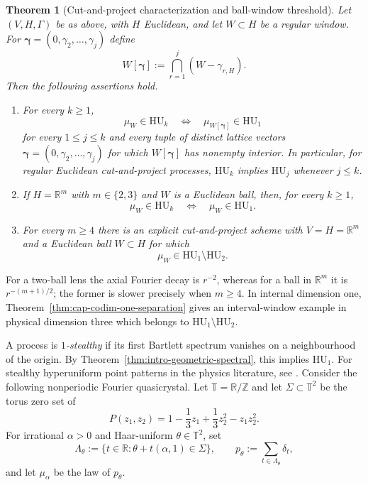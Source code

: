 \documentclass[11pt,reqno,a4paper]{amsart}
\numberwithin{equation}{section}
\theoremstyle{compact}
\newtheorem{maintheorem}{Theorem}
\theoremstyle{definition}
\theoremstyle{definition}
\newcommand{\HU}{\mathrm{HU}}
\begin{document}
\begin{maintheorem}[Cut-and-project characterization and ball-window threshold]
\label{thm:intro-cut-project}
Let $(V,H,\Gamma)$ be as above, with $H$ Euclidean, and let $W\subset H$ be
a regular window.  For
$\boldsymbol\gamma=(0,\gamma_2,\ldots,\gamma_j)$ define
\[
  W[\boldsymbol\gamma]
  :=\bigcap_{r=1}^j(W-\gamma_{r,H}).
\]
Then the following assertions hold.
\begin{enumerate}[label=\textup{(\roman*)}]
\item For every $k\geq1$,
\begin{equation}\label{eq:intro-cap-characterization}
  \mu_W\in\HU_k
  \quad\Longleftrightarrow\quad
  \mu_{W[\boldsymbol\gamma]}\in\HU_1
\end{equation}
for every $1\leq j\leq k$ and every tuple of distinct lattice vectors
$\boldsymbol\gamma=(0,\gamma_2,\ldots,\gamma_j)$ for which
$W[\boldsymbol\gamma]$ has nonempty interior.  In particular, for regular
Euclidean cut-and-project processes, $\HU_k$ implies $\HU_j$ whenever
$j\leq k$.
\item If $H=\mathbb R^m$ with $m\in\{2,3\}$ and $W$ is a Euclidean ball,
then, for every $k\geq1$,
\begin{equation}\label{eq:intro-cap-low-dim}
  \mu_W\in\HU_k\quad\Longleftrightarrow\quad\mu_W\in\HU_1.
\end{equation}
\item For every $m\geq4$ there is an explicit cut-and-project scheme with
$V=H=\mathbb R^m$ and a Euclidean ball $W\subset H$ for which
\begin{equation}\label{eq:intro-cap-high-dim}
  \mu_W\in\HU_1\setminus\HU_2.
\end{equation}
\end{enumerate}
\end{maintheorem}

For a two-ball lens the axial Fourier decay is $r^{-2}$, whereas for a
ball in $\mathbb R^m$ it is $r^{-(m+1)/2}$; the former is slower precisely
when $m\geq4$.
In internal dimension one, Theorem~\ref{thm:cap-codim-one-separation} gives an
interval-window example in physical dimension three which belongs to
$\HU_1\setminus\HU_2$.

A process is \emph{$1$-stealthy} if its first Bartlett spectrum vanishes on a
neighbourhood of the origin.  By Theorem~\ref{thm:intro-geometric-spectral},
this implies $\HU_1$.  For stealthy hyperuniform point patterns in the
physics literature, see \cite{TZS15}.  Consider the following nonperiodic
Fourier quasicrystal.  Let
$\mathbb T=\mathbb R/\mathbb Z$ and let $\Sigma\subset\mathbb T^2$ be the
torus zero set of
\[
  P(z_1,z_2)=1-\frac13z_1+\frac13z_2^2-z_1z_2^2.
\]
For irrational $\alpha>0$ and Haar-uniform $\theta\in\mathbb T^2$, set
\[
  \Lambda_\theta:=\{t\in\mathbb R:\theta+t(\alpha,1)\in\Sigma\},
  \qquad
  p_\theta:=\sum_{t\in\Lambda_\theta}\delta_t,
\]
and let $\mu_\alpha$ be the law of $p_\theta$.
\end{document}
